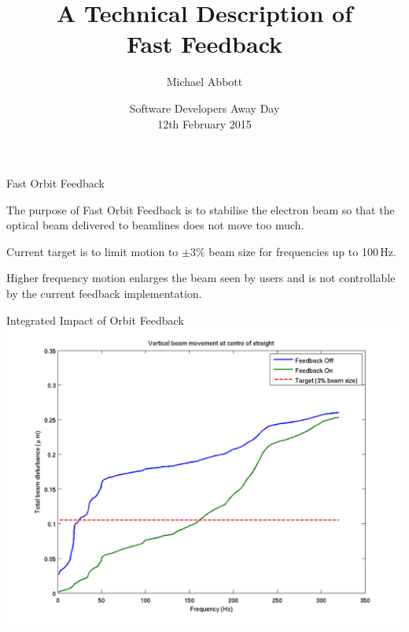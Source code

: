 \documentclass{beamer}
\title[Fast Feedback]{A Technical Description of\\Fast Feedback}
\author{Michael Abbott}
\date{Software Developers Away Day\\ 12th February 2015}
\begin{document}
\begin{frame}
\titlepage
\end{frame}



%
\begin{frame}{Fast Orbit Feedback}

The purpose of Fast Orbit Feedback is to stabilise the electron beam so that the
optical beam delivered to beamlines does not move too much.

\medskip

Current target is to limit motion to $\pm 3\%$ beam size for frequencies up to
100\,Hz.

\medskip

Higher frequency motion enlarges the beam seen by users and is not controllable
by the current feedback implementation.

\end{frame}


%
\begin{frame}{Integrated Impact of Orbit Feedback}
\includegraphics[width=\linewidth]{fb-on-off-integ}
\end{frame}
\end{document}
